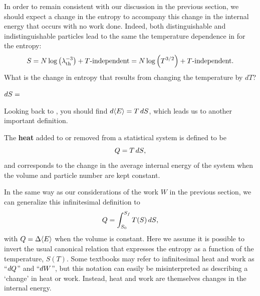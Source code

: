 In order to remain consistent with our discussion in the previous section, we should expect a change in the entropy to accompany this change in the internal energy that occurs with no work done.
Indeed, both distinguishable and indistinguishable particles lead to the same the temperature dependence in  for the entropy:
\begin{equation*}
  S = N\log\left(\lambda_{\mathrm{th}}^{-3}\right) + T\mbox{-independent} = N\log\left(T^{3 / 2}\right) + T\mbox{-independent}.
\end{equation*}
What is the change in entropy that results from changing the temperature by $dT$?
\begin{mdframed}
  $\displaystyle \mathop{dS} = $ \\[50 pt]
\end{mdframed}
Looking back to , you should find $\mathop{d\!\left\langle E \right\rangle} = T \mathop{dS}$, which leads us to another important definition.

\begin{shaded}
  The \textbf{heat} added to or removed from a statistical system is defined to be
  \begin{equation}
    \label{eq:heat_def}
    Q = T \mathop{dS},
  \end{equation}
  and corresponds to the change in the average internal energy of the system when the volume and particle number are kept constant.
\end{shaded}

In the same way as our considerations of the work $W$ in the previous section, we can generalize this infinitesimal definition to
\begin{equation}
  \label{eq:heat}
  Q = \int_{S_0}^{S_f} T(S) \mathop{dS},
\end{equation}
with $Q = \Delta\!\left\langle E \right\rangle$ when the volume is constant.
Here we assume it is possible to invert the usual canonical relation that expresses the entropy as a function of the temperature, $S(T)$.
Some textbooks may refer to infinitesimal heat and work as ``$\mathop{dQ}$'' and ``$\mathop{dW}$'', but this notation can easily be misinterpreted as describing a `change' in heat or work.
Instead, heat and work are themselves changes in the internal energy.

